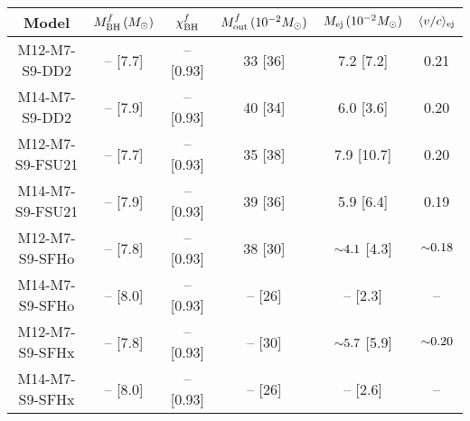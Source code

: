 \begin{tabular}{c cc ccc}
	\toprule \toprule
	Model & $M_{\rm BH}^f\,(M_\odot)$ & $\chi_{\rm BH}^f$ & $M_{\rm out}^f\,(10^{-2} M_\odot)$ & $M_{\rm ej}\,(10^{-2} M_\odot)$ & $\langle v/c \rangle_{\rm ej}$\\
	\midrule
	M12-M7-S9-DD2 & -- [7.7] & -- [0.93] & 33 [36] & 7.2 [7.2] & 0.21\\
	M14-M7-S9-DD2 & -- [7.9] & -- [0.93] & 40 [34] & 6.0 [3.6] & 0.20\\
	M12-M7-S9-FSU21 & -- [7.7] & -- [0.93] & 35 [38] & 7.9 [10.7] & 0.20\\
	M14-M7-S9-FSU21 & -- [7.9] & -- [0.93] & 39 [36] & 5.9 [6.4] & 0.19\\
	M12-M7-S9-SFHo & -- [7.8] & -- [0.93] & 38 [30] & $\mathord{\sim} 4.1$ [4.3] & $\mathord{\sim} 0.18$\\
	M14-M7-S9-SFHo & -- [8.0] & -- [0.93] & -- [26] & -- [2.3] & --\\
	M12-M7-S9-SFHx & -- [7.8] & -- [0.93] & -- [30] & $\mathord{\sim} 5.7$ [5.9] & $\mathord{\sim}0.20 $\\
	M14-M7-S9-SFHx & -- [8.0] & -- [0.93] & -- [26] & -- [2.6] & --\\
	\bottomrule \bottomrule
\end{tabular}